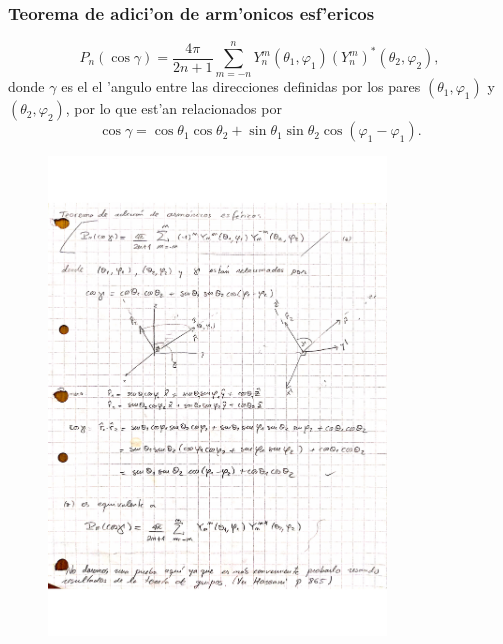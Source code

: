 \subsubsection{Teorema de adici'on de arm'onicos esf'ericos}
\begin{equation}
P_n(\cos\gamma) = \frac{4\pi}{2n+1} \sum_{m=-n}^n Y_n^m(\theta_1,\varphi_1)(Y_n^{m})^\ast(\theta_2,\varphi_2),
\end{equation}
donde $\gamma$ es el el 'angulo entre las direcciones definidas por los pares $(\theta_1,\varphi_1)$ y $(\theta_2,\varphi_2)$, por lo que est'an relacionados por
\begin{equation}
\cos\gamma = \cos\theta_1\cos\theta_2 + \sin\theta_1\sin\theta_2\cos(\varphi_1-\varphi_1).
\end{equation}

\begin{figure}[H]
\centering
\includegraphics[angle=0,width=0.8\textwidth]{figs/FM2-01_8.pdf}
\end{figure}
